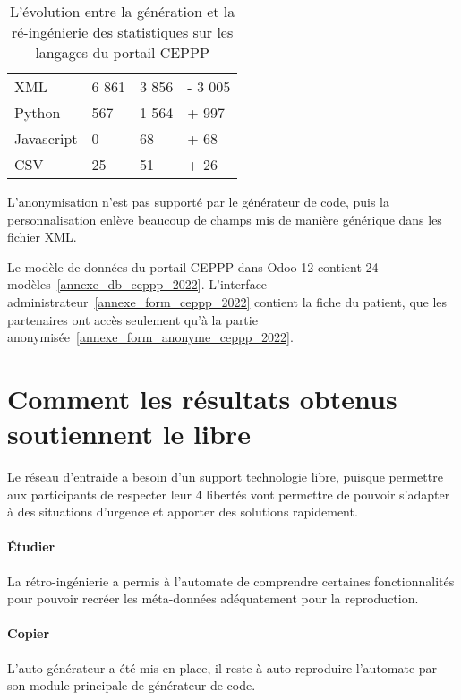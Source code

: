 \begin{table}[htb]
\caption{L'évolution entre la génération et la ré-ingénierie des statistiques sur les langages du portail CEPPP}
\centering
\begin{tabular}{|l|l|l|l|}

\hline
\cellcolor[HTML]{d9d9d9}{\textbf{Langage}} & \cellcolor[HTML]{d9d9d9}{\# Ligne extrait} & \cellcolor[HTML]{d9d9d9}{\# Ligne personnalisé} & \cellcolor[HTML]{d9d9d9}{\# Diff}\\\hline

XML & 6 861 & 3 856 & - 3 005\\\hline
Python & 567 & 1 564 & + 997\\\hline
Javascript & 0 & 68 & + 68\\\hline
CSV & 25 & 51 & + 26\\\hline

\end{tabular}
\label{tab:stat_code_portail_ceppp}
\end{table}

L'anonymisation n'est pas supporté par le générateur de code, puis la personnalisation enlève beaucoup de champs mis de manière générique dans les fichier XML. 

Le modèle de données du portail CEPPP dans Odoo 12 contient 24 modèles~\ref{annexe_db_ceppp_2022}. L'interface administrateur~\ref{annexe_form_ceppp_2022} contient la fiche du patient, que les partenaires ont accès seulement qu'à la partie anonymisée~\ref{annexe_form_anonyme_ceppp_2022}.


\section{Comment les résultats obtenus soutiennent le libre}
Le réseau d’entraide a besoin d’un support technologie libre, puisque permettre aux participants de respecter leur 4 libertés vont permettre de pouvoir s’adapter à des situations d’urgence et apporter des solutions rapidement.

\paragraph{Étudier}
La rétro-ingénierie a permis à l’automate de comprendre certaines fonctionnalités pour pouvoir recréer les méta-données adéquatement pour la reproduction.

\paragraph{Copier}
L’auto-générateur a été mis en place, il reste à auto-reproduire l’automate par son module principale de générateur de code.

